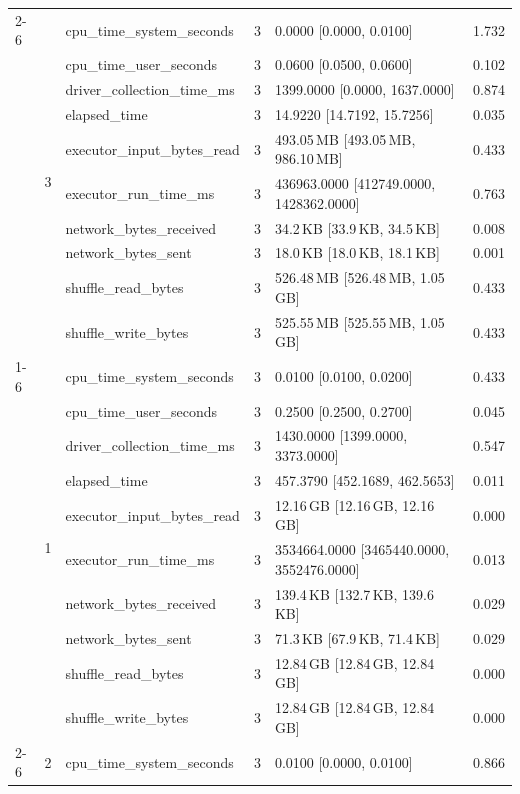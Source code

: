 \begin{tabular}{lllrll}
\cline{2-6}
 & \multirow[t]{10}{*}{3} & cpu_time_system_seconds & 3 & 0.0000 [0.0000, 0.0100] & 1.732 \\
 &  & cpu_time_user_seconds & 3 & 0.0600 [0.0500, 0.0600] & 0.102 \\
 &  & driver_collection_time_ms & 3 & 1399.0000 [0.0000, 1637.0000] & 0.874 \\
 &  & elapsed_time & 3 & 14.9220 [14.7192, 15.7256] & 0.035 \\
 &  & executor_input_bytes_read & 3 & 493.05\,MB [493.05\,MB, 986.10\,MB] & 0.433 \\
 &  & executor_run_time_ms & 3 & 436963.0000 [412749.0000, 1428362.0000] & 0.763 \\
 &  & network_bytes_received & 3 & 34.2\,KB [33.9\,KB, 34.5\,KB] & 0.008 \\
 &  & network_bytes_sent & 3 & 18.0\,KB [18.0\,KB, 18.1\,KB] & 0.001 \\
 &  & shuffle_read_bytes & 3 & 526.48\,MB [526.48\,MB, 1.05\,GB] & 0.433 \\
 &  & shuffle_write_bytes & 3 & 525.55\,MB [525.55\,MB, 1.05\,GB] & 0.433 \\
\cline{1-6} \cline{2-6}
\multirow[t]{30}{*}{national-scale-spatial-join-databricks-broadcast-2-nodes-large} & \multirow[t]{10}{*}{1} & cpu_time_system_seconds & 3 & 0.0100 [0.0100, 0.0200] & 0.433 \\
 &  & cpu_time_user_seconds & 3 & 0.2500 [0.2500, 0.2700] & 0.045 \\
 &  & driver_collection_time_ms & 3 & 1430.0000 [1399.0000, 3373.0000] & 0.547 \\
 &  & elapsed_time & 3 & 457.3790 [452.1689, 462.5653] & 0.011 \\
 &  & executor_input_bytes_read & 3 & 12.16\,GB [12.16\,GB, 12.16\,GB] & 0.000 \\
 &  & executor_run_time_ms & 3 & 3534664.0000 [3465440.0000, 3552476.0000] & 0.013 \\
 &  & network_bytes_received & 3 & 139.4\,KB [132.7\,KB, 139.6\,KB] & 0.029 \\
 &  & network_bytes_sent & 3 & 71.3\,KB [67.9\,KB, 71.4\,KB] & 0.029 \\
 &  & shuffle_read_bytes & 3 & 12.84\,GB [12.84\,GB, 12.84\,GB] & 0.000 \\
 &  & shuffle_write_bytes & 3 & 12.84\,GB [12.84\,GB, 12.84\,GB] & 0.000 \\
\cline{2-6}
 & \multirow[t]{10}{*}{2} & cpu_time_system_seconds & 3 & 0.0100 [0.0000, 0.0100] & 0.866 \\

\end{tabular}
